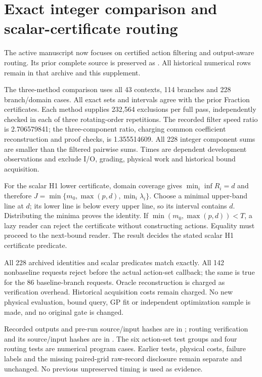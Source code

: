 \section{Exact integer comparison and scalar-certificate routing}

The active manuscript now focuses on certified action filtering and output-aware routing. Its prior complete source is preserved as . All historical numerical rows remain in that archive and this supplement.

The three-method comparison uses all 43 contexts, 114 branches and 228 branch/domain cases. All exact sets and intervals agree with the prior Fraction certificates. Each method supplies 232,564 exclusions per full pass, independently checked in each of three rotating-order repetitions. The recorded filter speed ratio is 2.706579841; the three-component ratio, charging common coefficient reconstruction and proof checks, is 1.355514609. All 228 integer component sums are smaller than the filtered pairwise sums. Times are dependent development observations and exclude I/O, grading, physical work and historical bound acquisition.

For the scalar H1 lower certificate, domain coverage gives $\min_i\inf R_i=d$ and therefore $J=\min\{m_0,\max(p,d),\min_i\lambda_i\}$. Choose a minimal upper-band line at $d$; its lower line is below every upper line, so its interval contains $d$. Distributing the minima proves the identity. If $\min(m_0,\max(p,d))<T$, a lazy reader can reject the certificate without constructing actions. Equality must proceed to the next-bound reader. The result decides the stated scalar H1 certificate predicate.

All 228 archived identities and scalar predicates match exactly. All 142 nonbaseline requests reject before the actual action-set callback; the same is true for the 86 baseline-branch requests. Oracle reconstruction is charged as verification overhead. Historical acquisition costs remain charged. No new physical evaluation, bound query, GP fit or independent optimization sample is made, and no original gate is changed.

Recorded outputs and pre-run source/input hashes are in ; routing verification and its source/input hashes are in . The six action-set test groups and four routing tests are numerical program cases. Earlier tests, physical costs, failure labels and the missing paired-grid raw-record disclosure remain separate and unchanged. No previous unpreserved timing is used as evidence.

